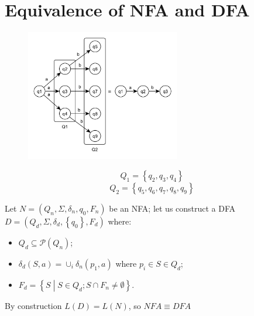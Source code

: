 \section{Equivalence of NFA and DFA}
\begin{figure}[H]
    \centerline{\includegraphics[width=0.6\textwidth]{img/1.pdf}}
\end{figure}
$$
	Q_1 = \left\{q_2, q_3, q_4\right\}
$$
$$
	Q_2 = \left\{q_5, q_6, q_7, q_8, q_9\right\}
$$

Let $N = (Q_n, \Sigma, \delta_n, q_0, F_n)$ be an NFA; let us construct a DFA $D = (Q_d, \Sigma, \delta_d, \left\{q_0\right\}, F_d)$ where:
\begin{itemize}
	\item $Q_d \subseteq \mathscr{P}(Q_n)$;
	\item $\delta_d(S, a) = \cup_i \delta_n(p_1, a)$ where $p_i \in S \in Q_d$;
	\item $F_d = \left\{S \middle| S \in Q_d; S \cap F_n \neq \emptyset \right\}$.
\end{itemize}
By construction $L(D) = L(N)$, so $NFA \equiv DFA$

